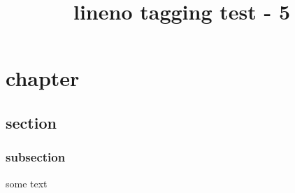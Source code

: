 \documentclass{book}
\title{lineno tagging test - 5}
\begin{document}
\linenumbers
\chapter{chapter}
\section{section}
\subsection{subsection}
some text
\end{document}
